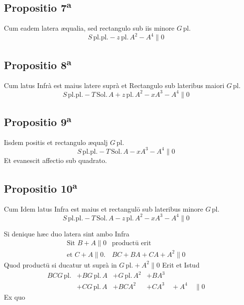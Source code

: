 \documentclass[11pt,a4paper]{article}
\begin{document}
\subsection*{Propositio 7\textsuperscript{a}}

Cum eadem latera æqualia, sed rectangulo sub iis minore $G\,\mathrm{pl.}$
\[ S\,\mathrm{pl.pl.} - z\,\mathrm{pl.}\,A^{2} - A^{4} \parallel 0 \]

\subsection*{Propositio 8\textsuperscript{a}}

Cum latus Infrà est maius latere suprà et Rectangulo sub lateribus maiori $G\,\mathrm{pl.}$
\[ S\,\mathrm{pl.pl.} - T\,\mathrm{Sol.}\,A + z\,\mathrm{pl.}\,A^{2} - xA^{3} - A^{4} \parallel 0 \]

\subsection*{Propositio 9\textsuperscript{a}}

Iisdem positis et rectangulo æqualj $G\,\mathrm{pl.}$
\[ S\,\mathrm{pl.pl.} - T\,\mathrm{Sol.}\,A - xA^{3} - A^{4} \parallel 0 \]
Et evanescit affectio sub quadrato.

\subsection*{Propositio 10\textsuperscript{a}}

Cum Idem latus Infra est maius et rectangulō sub lateribus minore $G\,\mathrm{pl.}$
\[ S\,\mathrm{pl.pl.} - T\,\mathrm{Sol.}\,A - z\,\mathrm{pl.}\,A^{2} - xA^{3} - A^{4} \parallel 0 \]

Si denique hæc duo latera sint ambo Infra
\[ \begin{array}{ll} \text{Sit } B + A \parallel 0 & \text{productū erit} \\ \text{et } C + A \parallel 0. & BC + BA + CA + A^{2} \parallel 0 \end{array} \]
Quod productū si ducatur ut suprà in $G\,\mathrm{pl.} + A^{2} \parallel 0$ Erit et Istud
\[ \begin{array}{llll} BCG\,\mathrm{pl.} & + BG\,\mathrm{pl.}\,A & + G\,\mathrm{pl.}\,A^{2} & + BA^{3} \\ & + CG\,\mathrm{pl.}\,A & + BCA^{2} & + CA^{3} \quad + A^{4} \quad \parallel 0 \end{array} \]
Ex quo
\end{document}
